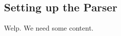 \newpage
\hypertarget{M2TSettingUp tex}{}
\subsection{Setting up the Parser}
\texHeader

Welp. We need some content.
